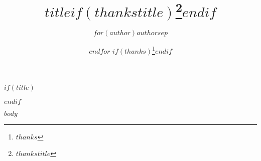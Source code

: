 \documentclass[12pt]{article}
\theoremstyle{plain}
\begin{document}
$if(title)$
\title{$title$$if(thankstitle)$\thanks{$thankstitle$}$endif$}
$endif$
\author{$for(author)$$author$$sep$ \and $endfor$ $if(thanks)$\thanks{$thanks$}$endif$}

\maketitle

\vspace{-.3in}

$body$
\end{document}

